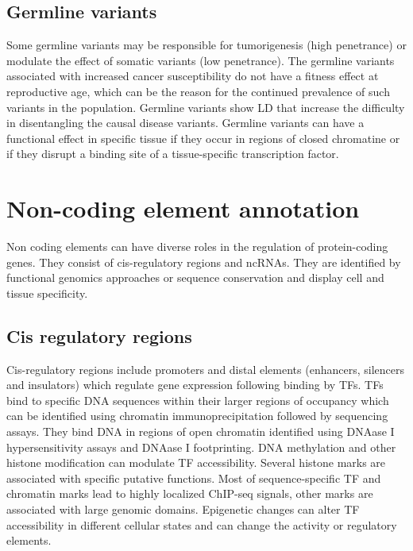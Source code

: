 	\subsection{Germline variants}
	Some germline variants may be responsible for tumorigenesis (high penetrance) or modulate the effect of somatic variants (low penetrance).
	The germline variants associated with increased cancer susceptibility do not have a fitness effect at reproductive age, which can be the reason for the continued prevalence of such variants in the population.
	Germline variants show LD that increase the difficulty in disentangling the causal disease variants.
	Germline variants can have a functional effect in specific tissue if they occur in regions of closed chromatine or if they disrupt a binding site of a tissue-specific transcription factor.

\section{Non-coding element annotation}
Non coding elements can have diverse roles in the regulation of protein-coding genes.
They consist of cis-regulatory regions and ncRNAs.
They are identified by functional genomics approaches or sequence conservation and display cell and tissue specificity.

	\subsection{Cis regulatory regions}
	Cis-regulatory regions include promoters and distal elements (enhancers, silencers and insulators) which regulate gene expression following binding by TFs.
	TFs bind to specific DNA sequences within their larger regions of occupancy which can be identified using chromatin immunoprecipitation followed by sequencing assays.
	They bind DNA in regions of open chromatin identified using DNAase I hypersensitivity assays and DNAase I footprinting.
	DNA methylation and other histone modification can modulate TF accessibility.
	Several histone marks are associated with specific putative functions.
	Most of sequence-specific TF and chromatin marks lead to highly localized ChIP-seq signals, other marks are associated with large genomic domains.
	Epigenetic changes can alter TF accessibility in  different cellular states and can change the activity or regulatory elements.


